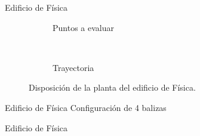 \documentclass{beamer}
\begin{document}
  \begin{frame}{Edificio de Física}
    \begin{figure}[H]
      \begin{subfigure}[b]{.42\textwidth}
        \centering
        \def\svgwidth{\linewidth}
         
        \caption{Puntos a evaluar}
        \label{fig:puntos_fisica}
      \end{subfigure}
      ~~
      \begin{subfigure}[b]{.42\textwidth}
        \centering
        \def\svgwidth{\linewidth}
         
        \caption{Trayectoria}
        \label{fig:trayecto_fisica}
      \end{subfigure}
      \caption{Disposición de la planta del edificio de Física.}
      \label{fig:fisica}
    \end{figure}
  \end{frame}

  \begin{frame}{Edificio de Física}
    Configuración de 4 balizas
    \begin{figure}[H]
      \centering
      \def\svgwidth{0.5\linewidth}
       
      \label{fig:sensores_fisica_4}
    \end{figure}
  \end{frame}
  
  \begin{frame}{Edificio de Física}
    \begin{figure}[H]
      \centering
      \scalebox{0.6}{}
      \label{fig:res_fisica_4}
    \end{figure}
  \end{frame}
  
\end{document}
